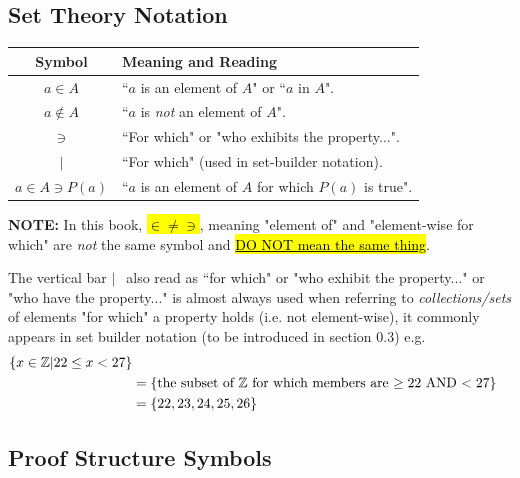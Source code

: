\subsection{Set Theory Notation}

\begin{center}
\begin{tabular}{|c|l|}
    \hline
    \textbf{Symbol} & \textbf{Meaning and Reading} \\
    \hline
    $a \in A$ & ``$a$ is an element of $A$" or ``$a$ in $A$". \index{$\in$} \\
    $a \not\in A$ & ``$a$ is \textit{not} an element of $A$". \index{$\not\in$} \\
    $\ni$ & ``For which" or "who exhibits the property...". \index{$\ni$}\\
    $|$ & ``For which" (used in set-builder notation). \\
    $a \in A \ni P(a)$ & ``$a$ is an element of $A$ for which $P(a)$ is true". \\
    \hline
\end{tabular}
\end{center}

\begin{tcolorbox}
\begin{center}
\textbf{NOTE:} In this book, \hl{$\in \neq \ni$}, meaning "element of" and "element-wise for which" are \textit{not} the same symbol and \underline{\hl{DO NOT mean the same thing}}.
\end{center}
\end{tcolorbox}

\noindent The vertical bar  $| \ \ $ also read as ``for which" or "who exhibit the property..." or "who have the property..." is almost always used when referring to \textit{collections/sets} of elements "for which" a property holds (i.e. not element-wise), it commonly appears in set builder notation (to be introduced in section 0.3) e.g. 
\begin{align}
    \{x\in {\mathbb{ Z}} | 22\leq x < 27\}  \nonumber \\
    &= \{ \text{the subset of ${\mathbb{ Z}}$ for which members are $\geq 22$ AND $<27$} \} \nonumber \\
    &= \{22,23,24,25,26\}\nonumber
\end{align}

\subsection{Proof Structure Symbols}

